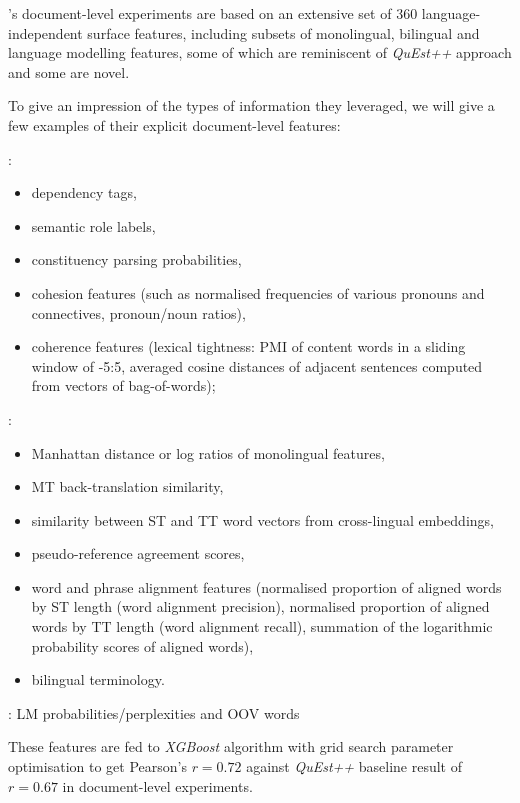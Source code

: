 \citeauthor{Yuan2018}'s \citeyear{Yuan2018} document-level experiments are based on an extensive set of 360 language-independent surface features, including subsets of monolingual, bilingual and language modelling features, some of which are reminiscent of \textit{QuEst++} approach and some are novel.

To give an impression of the types of information they leveraged, we will give a few examples of their explicit document-level features:
\begin{description}\compresslist{}
	\item[monolingual]: 
	\begin{itemize}\compresslist{}
		\item dependency tags, 
		\item semantic role labels, 
		\item constituency parsing probabilities, 
		\item cohesion features (such as normalised frequencies of various pronouns and connectives, pronoun/noun ratios), 
		\item coherence features (lexical tightness: \gls{PMI} of content words in a sliding window of -5:5, averaged cosine distances of adjacent sentences computed from vectors of bag-of-words);
	\end{itemize}
	
	\item[bilingual]:
	\begin{itemize}\compresslist{}
		\item Manhattan distance or log ratios of monolingual features, 
		\item MT back-translation similarity,
		\item similarity between ST and TT word vectors from cross-lingual embeddings, 
		\item pseudo-reference agreement scores,
		\item word and phrase alignment features (normalised proportion of aligned words by ST length (word alignment precision), normalised proportion of aligned words by TT length (word alignment recall), summation of the logarithmic probability scores of aligned words),
		\item bilingual terminology.
	\end{itemize}
	\item[language modelling features]: LM probabilities/perplexities and \gls{OOV} words
\end{description} 

These features are fed to \textit{XGBoost} algorithm with grid search parameter optimisation to get Pearson's $r=0.72$ against \textit{QuEst++} baseline result of $r=0.67$ in document-level experiments.

